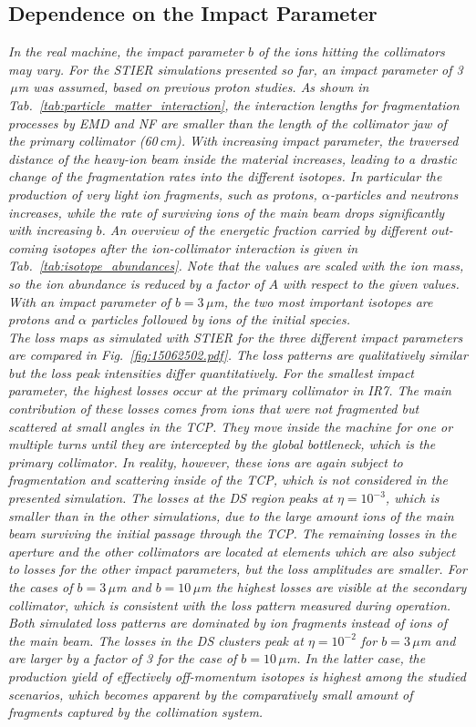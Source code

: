 \subsection{Dependence on the Impact Parameter}

\textit{In the real machine, the impact parameter $b$ of the ions hitting the collimators may vary. For the STIER simulations presented so far, an impact parameter of 3$\,\mu$m was assumed, based on previous proton studies. As shown in Tab.~\ref{tab:particle_matter_interaction}, the interaction lengths for fragmentation processes by EMD and NF are smaller than the length of the collimator jaw of the primary collimator (60$\,$cm). With increasing impact parameter, the traversed distance of the heavy-ion beam inside the material increases, leading to a drastic change of the fragmentation rates into the different isotopes. In particular the production of very light ion fragments, such as protons, $\alpha$-particles and neutrons increases, while the rate of surviving ions of the main beam drops significantly with increasing $b$. An overview of the energetic fraction carried by different out-coming isotopes after the ion-collimator interaction is given in Tab.~\ref{tab:isotope_abundances}. Note that the values are scaled with the ion mass, so the ion abundance is reduced by a factor of $A$ with respect to the given values. With an impact parameter of $b=3\,\mu$m, the two most important isotopes are protons and $\alpha$ particles followed by \lead ions of the initial species. 
\\
The loss maps as simulated with STIER for the three different impact parameters are compared in Fig.~\ref{fig:15062502.pdf}. The loss patterns are qualitatively similar but the loss peak intensities differ quantitatively. For the smallest impact parameter, the highest losses occur at the primary collimator in IR7. The main contribution of these losses comes from \lead ions that were not fragmented but scattered at small angles in the TCP. They move inside the machine for one or multiple turns until they are intercepted by the global bottleneck, which is the primary collimator. In reality, however, these ions are again subject to fragmentation and scattering inside of the TCP, which is not considered in the presented simulation. The losses at the DS region peaks at $\eta=10^{-3}$, which is smaller than in the other simulations, due to the large amount ions of the main beam surviving the initial passage through the TCP. The remaining losses in the aperture and the other collimators are located at elements which are also subject to losses for the other impact parameters, but the loss amplitudes are smaller. For the cases of $b=3\,\mu$m and $b=10\,\mu$m the highest losses are visible at the secondary collimator, which is consistent with the loss pattern measured during operation. Both simulated loss patterns are dominated by ion fragments instead of ions of the main beam. The losses in the DS clusters peak at $\eta=10^{-2}$ for $b=3\,\mu$m and are larger by a factor of 3 for the case of $b=10\,\mu$m. In the latter case, the production yield of effectively off-momentum isotopes is highest among the studied scenarios, which becomes apparent by the comparatively small amount of fragments captured by the collimation system.
}
